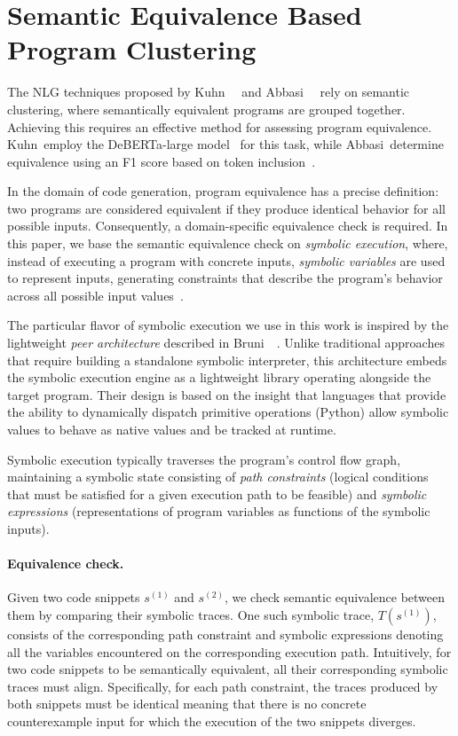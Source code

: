 \section{Semantic Equivalence Based Program Clustering}
\label{sec:symexclustering}

The NLG techniques proposed by Kuhn~\etal~\cite{kuhnsemantic} and Abbasi~\etal~\cite{abbasi2024believe} rely on semantic clustering, where semantically equivalent programs are grouped together. 
Achieving this requires an effective method for assessing program equivalence. Kuhn~\etal employ the DeBERTa-large model~\cite{he2020deberta} for this task, while Abbasi~\etal determine equivalence using an F1 score based on token inclusion~\cite{DBLP:journals/corr/JoshiCWZ17}.

In the domain of code generation, program equivalence has a precise definition: two programs are considered equivalent if they produce identical behavior for all possible inputs. 
Consequently, a domain-specific equivalence check is required.
In this paper, we base the semantic equivalence check on \emph{symbolic execution}, where, instead of executing a program with concrete inputs, \emph{symbolic variables} are used to represent inputs, generating constraints that describe the program's behavior across all possible input values~\cite{symex_klee}.

The particular flavor of symbolic execution we use in this work is inspired by the lightweight \emph{peer architecture} described in Bruni~\etal~\cite{Bruni2011APA}. 
Unlike traditional approaches that require building a standalone symbolic interpreter, this architecture embeds the symbolic execution engine as a lightweight library operating alongside the target program. 
Their design is based on the insight that languages that provide the ability to dynamically dispatch primitive operations (\eg Python) allow symbolic values to behave as native values and be tracked at runtime.

Symbolic execution typically traverses the program's control flow graph, maintaining a symbolic state consisting of \emph{path constraints} (\ie logical conditions that must be satisfied for a given execution path to be feasible) and \emph{symbolic expressions} (\ie representations of program variables as functions of the symbolic inputs). 

\paragraph{Equivalence check.} Given two code snippets \(s^{(1)}\) and \(s^{(2)}\), we check semantic equivalence between them by comparing their symbolic traces. 
One such symbolic trace, \eg \(T(s^{(1)})\), consists of the corresponding path constraint and symbolic expressions denoting all the variables encountered on the corresponding execution path. 
Intuitively, for two code snippets to be semantically equivalent, all their corresponding symbolic traces must align. 
Specifically, for each path constraint, the traces produced by both snippets must be identical meaning that there is no concrete counterexample input for which the execution of the two snippets diverges.

